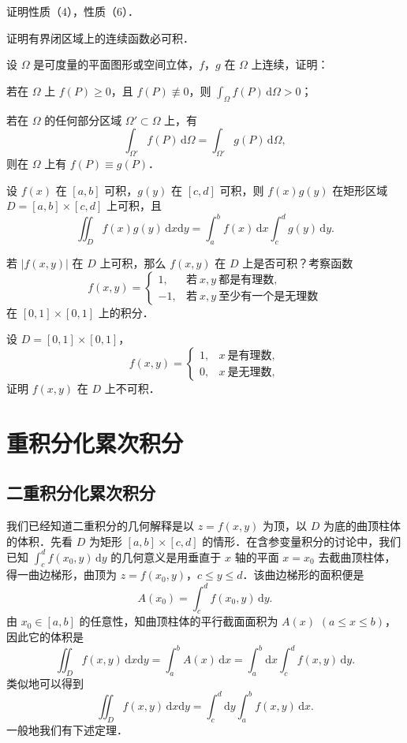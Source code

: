 \begin{xiti}
\item 证明性质（4），性质（6）．
\item 证明有界闭区域上的连续函数必可积．
\item 设 $\Omega$ 是可度量的平面图形或空间立体，$f$，$g$ 在 $\Omega$ 上连续，证明：
\begin{ziti}
\item 若在 $\Omega$ 上 $f(P)\geqslant 0$，且 $f(P)\not\equiv 0$，则 $\displaystyle\int_{\Omega}f(P)\,\mathrm{d}\Omega>0$；
\item 若在 $\Omega$ 的任何部分区域 $\Omega'\subset\Omega$ 上，有
\[
\int_{\Omega'}f(P)\,\mathrm{d}\Omega=\int_{\Omega'}g(P)\,\mathrm{d}\Omega,
\]
则在 $\Omega$ 上有 $f(P)\equiv g(P)$．
\end{ziti}
\item 设 $f(x)$ 在 $[a,b]$ 可积，$g(y)$ 在 $[c,d]$ 可积，则 $f(x)g(y)$ 在矩形区域 $D=[a,b]\times[c,d]$ 上可积，且
\[
\iint_{D}f(x)g(y)\,\mathrm{d}x\mathrm{d}y=\int_{a}^{b}f(x)\,\mathrm{d}x\int_{c}^{d}g(y)\,\mathrm{d}y.
\]
\item 若 $\left|f(x,y)\right|$ 在 $D$ 上可积，那么 $f(x,y)$ 在 $D$ 上是否可积？考察函数
\[
f(x,y)=\begin{cases}
1, & \text{若}\ x,y\ \text{都是有理数},\\
-1, & \text{若}\ x,y\ \text{至少有一个是无理数}
\end{cases}
\]
在 $[0,1]\times[0,1]$ 上的积分．
\item 设 $D=[0,1]\times[0,1]$，
\[
f(x,y)=\begin{cases}
1, & x\ \text{是有理数},\\
0, & x\ \text{是无理数},
\end{cases}
\]
证明 $f(x,y)$ 在 $D$ 上不可积．
\end{xiti}

\section{重积分化累次积分}\label{sec:20-2}

\subsection{二重积分化累次积分}

我们已经知道二重积分的几何解释是以 $z=f(x,y)$ 为顶，以 $D$ 为底的曲顶柱体的体积．先看 $D$ 为矩形 $[a,b]\times[c,d]$ 的情形．在含参变量积分的讨论中，我们已知 $\displaystyle\int_{c}^{d}f(x_{0},y)\,\mathrm{d}y$ 的几何意义是用垂直于 $x$ 轴的平面 $x=x_{0}$ 去截曲顶柱体，得一曲边梯形，曲顶为 $z=f(x_{0},y)$，$c\leqslant y\leqslant d$．该曲边梯形的面积便是
\[
A(x_{0})=\int_{c}^{d}f(x_{0},y)\,\mathrm{d}y.
\]
由 $x_{0}\in[a,b]$ 的任意性，知曲顶柱体的平行截面面积为 $A(x)$ $(a\leqslant x\leqslant b)$，因此它的体积是
\[
\iint_{D}f(x,y)\,\mathrm{d}x\mathrm{d}y=\int_{a}^{b}A(x)\,\mathrm{d}x=\int_{a}^{b}\mathrm{d}x\int_{c}^{d}f(x,y)\,\mathrm{d}y.
\]
类似地可以得到
\[
\iint_{D}f(x,y)\,\mathrm{d}x\mathrm{d}y=\int_{c}^{d}\mathrm{d}y\int_{a}^{b}f(x,y)\,\mathrm{d}x.
\]
一般地我们有下述定理．

